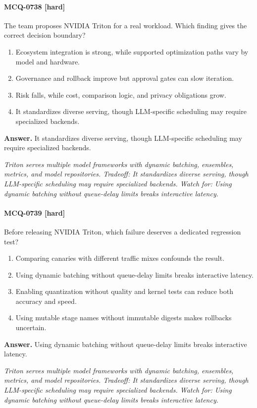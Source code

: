 \paragraph{MCQ-0738 [hard]} The team proposes NVIDIA Triton for a real workload. Which finding gives the correct decision boundary?
\begin{enumerate}[label=\Alph*.]
\item Ecosystem integration is strong, while supported optimization paths vary by model and hardware.
\item Governance and rollback improve but approval gates can slow iteration.
\item Risk falls, while cost, comparison logic, and privacy obligations grow.
\item It standardizes diverse serving, though LLM-specific scheduling may require specialized backends.
\end{enumerate}
\noindent\textbf{Answer.} It standardizes diverse serving, though LLM-specific scheduling may require specialized backends.
\par\textit{Triton serves multiple model frameworks with dynamic batching, ensembles, metrics, and model repositories. Tradeoff: It standardizes diverse serving, though LLM-specific scheduling may require specialized backends. Watch for: Using dynamic batching without queue-delay limits breaks interactive latency.}
\paragraph{MCQ-0739 [hard]} Before releasing NVIDIA Triton, which failure deserves a dedicated regression test?
\begin{enumerate}[label=\Alph*.]
\item Comparing canaries with different traffic mixes confounds the result.
\item Using dynamic batching without queue-delay limits breaks interactive latency.
\item Enabling quantization without quality and kernel tests can reduce both accuracy and speed.
\item Using mutable stage names without immutable digests makes rollbacks uncertain.
\end{enumerate}
\noindent\textbf{Answer.} Using dynamic batching without queue-delay limits breaks interactive latency.
\par\textit{Triton serves multiple model frameworks with dynamic batching, ensembles, metrics, and model repositories. Tradeoff: It standardizes diverse serving, though LLM-specific scheduling may require specialized backends. Watch for: Using dynamic batching without queue-delay limits breaks interactive latency.}
